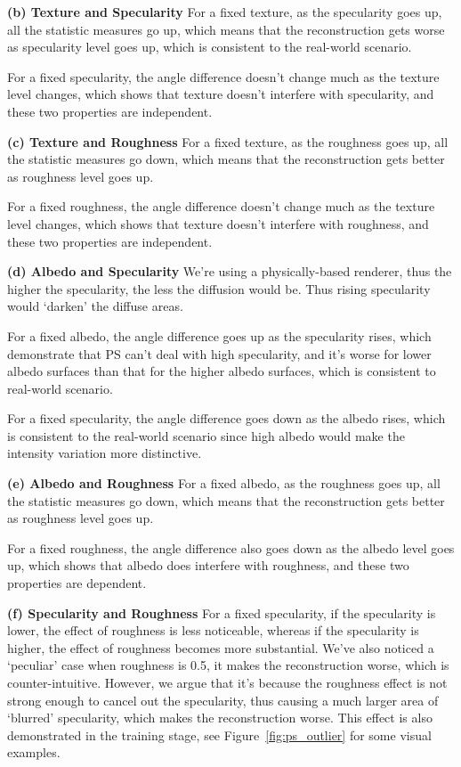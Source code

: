 \textbf{(b) Texture and Specularity} 
For a fixed texture, as the specularity goes up, all the statistic measures go up, which means that the reconstruction gets worse as specularity level goes up, which is consistent to the real-world scenario.

For a fixed specularity, the angle difference doesn't change much as the texture level changes, which shows that texture doesn't interfere with specularity, and these two properties are independent.

\textbf{(c) Texture and Roughness} 
For a fixed texture, as the roughness goes up, all the statistic measures go down, which means that the reconstruction gets better as roughness level goes up.

For a fixed roughness, the angle difference doesn't change much as the texture level changes, which shows that texture doesn't interfere with roughness, and these two properties are independent.

\textbf{(d) Albedo and Specularity} 
We're using a physically-based renderer, thus the higher the specularity, the less the diffusion would be. Thus rising specularity would `darken' the diffuse areas.

For a fixed albedo, the angle difference goes up as the specularity rises, which demonstrate that PS can't deal with high specularity, and it's worse for lower albedo surfaces than that for the higher albedo surfaces, which is consistent to real-world scenario.

For a fixed specularity, the angle difference goes down as the albedo rises, which is consistent to the real-world scenario since high albedo would make the intensity variation more distinctive.

\textbf{(e) Albedo and Roughness} 
For a fixed albedo, as the roughness goes up, all the statistic measures go down, which means that the reconstruction gets better as roughness level goes up.

For a fixed roughness, the angle difference also goes down as the albedo level goes up, which shows that albedo does interfere with roughness, and these two properties are dependent.

\textbf{(f) Specularity and Roughness}
For a fixed specularity, if the specularity is lower, the effect of roughness is less noticeable, whereas if the specularity is higher, the effect of roughness becomes more substantial. We've also noticed a `peculiar' case when roughness is 0.5, it makes the reconstruction worse, which is counter-intuitive. However, we argue that it's because the roughness effect is not strong enough to cancel out the specularity, thus causing a much larger area of `blurred' specularity, which makes the reconstruction worse. This effect is also demonstrated in the training stage, see Figure~\ref{fig:ps_outlier} for some visual examples.


